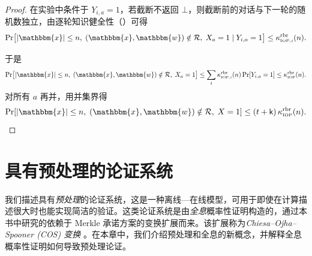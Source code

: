 \documentclass[american,singlepageview]{snargs-book-zh}
\newcommand{\RandomVariableX}{X}
\newcommand{\RandomVariableY}{Y}
\newcommand{\Relation}{\mathcal{R}}
\newcommand{\Instance}{\mathbbm{x}}
\newcommand{\Witness}{\mathbbm{w}}
\newcommand{\InstanceSize}{n}
\newcommand{\ProtoKnowledgeError}{\kappa}
\newcommand{\ProtoRoundComplexity}{\mathsf{k}}
\newcommand{\RoundIndex}{i}
\newcommand{\ProtoRBRKnowledgeError}{\ProtoKnowledgeError^{\RBRSuperscript}}
\newcommand{\IOPSubscript}{\scriptscriptstyle\mathrm{IOP}}
\newcommand{\IOPRoundComplexity}{\ProtoRoundComplexity}
\newcommand{\SRBudget}{t}
\newcommand{\SRMoveIndex}{a}
\newcommand{\RBRSuperscript}{\mathrm{rbr}}
\newcommand{\RBRKnowledgeError}{\ProtoRBRKnowledgeError_{\IOPSubscript}}
\newcommand{\RBRKnowledgeErrorIdx}[1]{\ProtoRBRKnowledgeError_{\IOPSubscript,#1}}
\begin{document}
\begin{proof}
在实验中条件于 $\RandomVariableY_{\RoundIndex,\SRMoveIndex}=1$，若截断不返回 $\bot$，则截断前的对话与下一轮的随机数独立，由逐轮知识健全性（）可得
\begin{equation}
\label{eq:straightline-sr-extractor-from-rbr-extractor-bound}
\Pr\bigl[
|\Instance|\le\InstanceSize,\;
(\Instance,\Witness)\notin\Relation,\;
\RandomVariableX_{\SRMoveIndex}=1
\mid
\RandomVariableY_{\RoundIndex,\SRMoveIndex}=1
\bigr]
\le
\RBRKnowledgeErrorIdx{\RoundIndex}(\InstanceSize).
\end{equation}

于是
\[
\Pr\bigl[
|\Instance|\le\InstanceSize,\;
(\Instance,\Witness)\notin\Relation,\;
\RandomVariableX_{\SRMoveIndex}=1
\bigr]
\le
\sum_{\RoundIndex}
\RBRKnowledgeErrorIdx{\RoundIndex}(\InstanceSize)
\Pr[\RandomVariableY_{\RoundIndex,\SRMoveIndex}=1]
\le
\RBRKnowledgeError(\InstanceSize).
\]
对所有 $\SRMoveIndex$ 再并，用并集界得
\[
\Pr[
|\Instance|\le\InstanceSize,\;
(\Instance,\Witness)\notin\Relation,\;
\RandomVariableX=1
]
\le
(\SRBudget+\IOPRoundComplexity)\,\RBRKnowledgeError(\InstanceSize).
\]
\end{proof}

\chapter{具有预处理的论证系统}
\label{chapter:preprocessing-snargs}

我们描述具有\emph{预处理}的论证系统，这是一种离线—在线模型，可用于即使在计算描述很大时也能实现简洁的验证。这类论证系统是由\emph{全息}概率性证明构造的，通过本书中研究的依赖于 Merkle 承诺方案的变换扩展而来。该扩展称为\emph{Chiesa–Ojha–Spooner (COS) 变换} \cite{ChiesaOS20}。在本章中，我们介绍预处理和全息的新概念，并解释全息概率性证明如何导致预处理论证。
\end{document}
